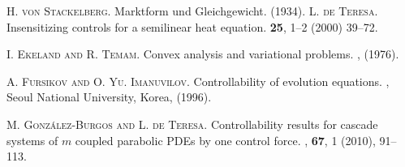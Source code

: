 \documentclass[preprint,10pt]{article}
\numberwithin{equation}{section}
\numberwithin{theorem}{section}
\begin{document}
{\begin{thebibliography}{7}
%
\textsc{H. von Stackelberg.}
\newblock Marktform und {G}leichgewicht.
 (1934).
%
\textsc{L. de Teresa.}
\newblock Insensitizing controls for a semilinear heat equation.
 \textbf{25}, 1--2 (2000) 39--72.
%
%
%
%
%

\textsc{I. Ekeland and R. Temam.}
\newblock Convex analysis and variational problems.
, (1976).
%
%
%
%
%



\textsc{A. Fursikov and O. Yu. Imanuvilov.}
\newblock Controllability of evolution equations.
, Seoul National University, Korea, (1996).

%
%
\textsc{M. Gonz\'alez-Burgos and L. de Teresa.}
\newblock Controllability results for cascade systems of $m$ coupled parabolic PDEs by one control force.
, \textbf{67}, 1 (2010), 91--113.


\end{thebibliography}}
\end{document}
